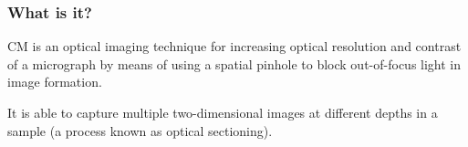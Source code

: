 \documentclass[t]{beamer}
\begin{document}
\begin{frame}
\frametitle{What is it?}

CM is an optical imaging technique for increasing optical resolution and contrast of a micrograph
by means of using a spatial pinhole to block out-of-focus light in image formation.

It is able to capture multiple two-dimensional images at different depths in a sample (a process known as optical sectioning).

\begin{figure}
\centering
\end{figure}
\end{frame}
\end{document}

